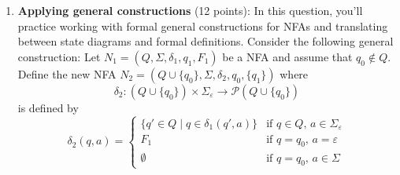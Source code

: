 \documentclass[12pt, oneside]{article}
\newcommand{\gradeCorrect}{({\it Graded for correctness}) }
\begin{document}
\begin{enumerate}[wide, labelwidth=!, labelindent=0pt]
Alternatively, you can justify your solution by first designing a DFA that recognizes $L(R)$, 
using the construction from class and the book to modify this DFA to get a new DFA that recognizes~$\overline{L(R)}$, 
and then applying the constructions from class and the book to convert this new DFA to a regular expression.

For each part of the question, clearly state which approach you're taking and include enough intermediate
steps to illustrate your work.


\begin{enumerate}
    \item\gradeCorrect $a^*b^*$
    \item\gradeCorrect $(a \cup b) a b^*$
\end{enumerate}


\item\textbf{Applying general constructions} (12 points):
In this question, you'll practice working with formal general constructions
for NFAs and translating between state diagrams and formal definitions.
Consider the following general construction: Let $N_1 = (Q, \Sigma, \delta_1, q_1, F_1)$ be a NFA
and assume that $q_0 \notin Q$.
Define the new NFA $N_2 = (Q \cup \{q_0\}, \Sigma, \delta_2, q_0, \{q_1\})$ where 
$$\delta_2: (Q \cup \{q_0\}) \times \Sigma_\varepsilon \to \mathcal{P} (Q \cup \{q_0\})$$ is defined by
\[
    \delta_2 (q,a) = \begin{cases}
        \{ q' \in Q \mid q \in \delta_1(q',a)\} &\text{if $q \in Q$, $a \in \Sigma_{\varepsilon}$} \\
        F_1 &\text{if $q =q_0$, $a = \varepsilon$}\\
        \emptyset &\text{if $q = q_0$, $a \in \Sigma$}
    \end{cases}
\]


\end{enumerate}
\end{document}
